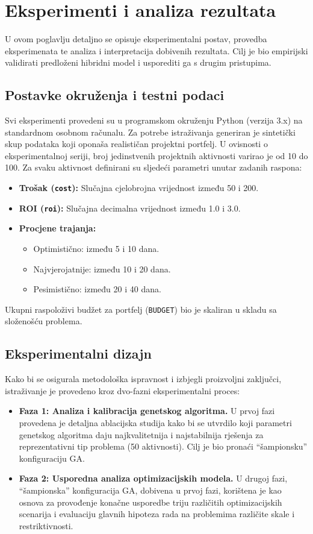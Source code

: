 \section{Eksperimenti i analiza rezultata}
\label{sec:eksperimenti}

U ovom poglavlju detaljno se opisuje eksperimentalni postav, provedba eksperimenata te analiza i interpretacija dobivenih rezultata. Cilj je bio empirijski validirati predloženi hibridni model i usporediti ga s drugim pristupima.

\subsection{Postavke okruženja i testni podaci}
Svi eksperimenti provedeni su u programskom okruženju Python (verzija 3.x) na standardnom osobnom računalu. Za potrebe istraživanja generiran je sintetički skup podataka koji oponaša realističan projektni portfelj. U ovisnosti o eksperimentalnoj seriji, broj jedinstvenih projektnih aktivnosti varirao je od 10 do 100. Za svaku aktivnost definirani su sljedeći parametri unutar zadanih raspona:
\begin{itemize}
    \item \textbf{Trošak (\texttt{cost}):} Slučajna cjelobrojna vrijednost između 50 i 200.
    \item \textbf{ROI (\texttt{roi}):} Slučajna decimalna vrijednost između 1.0 i 3.0.
    \item \textbf{Procjene trajanja:}
    \begin{itemize}
        \item Optimistično: između 5 i 10 dana.
        \item Najvjerojatnije: između 10 i 20 dana.
        \item Pesimistično: između 20 i 40 dana.
    \end{itemize}
\end{itemize}
Ukupni raspoloživi budžet za portfelj (\texttt{BUDGET}) bio je skaliran u skladu sa složenošću problema.

\subsection{Eksperimentalni dizajn}
Kako bi se osigurala metodološka ispravnost i izbjegli proizvoljni zaključci, istraživanje je provedeno kroz dvo-fazni eksperimentalni proces:
\begin{itemize}
    \item \textbf{Faza 1: Analiza i kalibracija genetskog algoritma.} U prvoj fazi provedena je detaljna ablacijska studija kako bi se utvrdilo koji parametri genetskog algoritma daju najkvalitetnija i najstabilnija rješenja za reprezentativni tip problema (50 aktivnosti). Cilj je bio pronaći ``šampionsku'' konfiguraciju GA.
    \item \textbf{Faza 2: Usporedna analiza optimizacijskih modela.} U drugoj fazi, ``šampionska'' konfiguracija GA, dobivena u prvoj fazi, korištena je kao osnova za provođenje konačne usporedbe triju različitih optimizacijskih scenarija i evaluaciju glavnih hipoteza rada na problemima različite skale i restriktivnosti.
\end{itemize}


